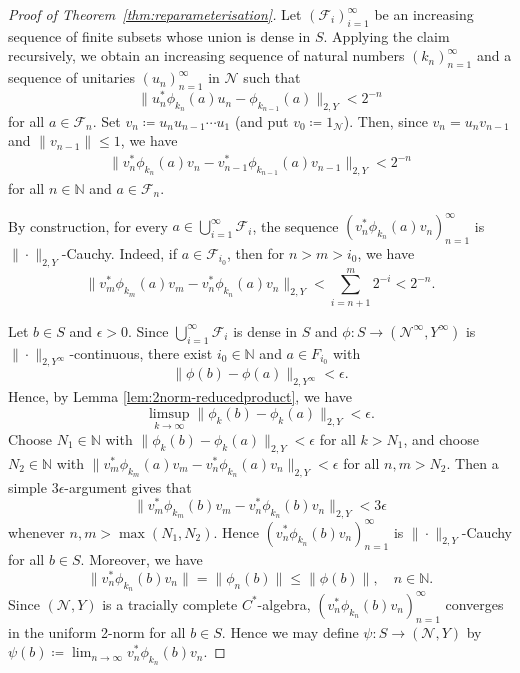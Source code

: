 \documentclass[a4paper,11pt]{amsart}
\theoremstyle{definition}
\numberwithin{equation}{section}
\numberwithin{theorem}{section}
\newcommand{\N}{\mathbb N}
\begin{document}
\begin{proof}[Proof of Theorem~\ref{thm:reparameterisation}]
Let $(\mathcal F_i)_{i=1}^\infty$ be an increasing sequence of finite subsets whose union is dense in $S$. Applying the claim recursively, we obtain an increasing sequence of natural numbers $(k_n)_{n=1}^\infty$ and a sequence of unitaries $(u_n)_{n=1}^\infty$ in $\mathcal{N}$ such that
\begin{equation}
	\|u_n^*\phi_{k_n}(a)u_n - \phi_{k_{n-1}}(a)\|_{2,Y} < 2^{-n}
\end{equation} 
for all $a \in \mathcal F_n$. Set $v_n\coloneqq u_nu_{n-1}\cdots u_1$ (and put $v_0 \coloneqq 1_{\mathcal N}$). Then, since $v_n = u_nv_{n-1}$ and $\|v_{n-1}\| \leq 1$, we have
\begin{equation}\begin{split}
	\|v_n^*\phi_{k_n}(a)v_n - v_{n-1}^*\phi_{k_{n-1}}(a)v_{n-1}\|_{2,Y} < 2^{-n}
\end{split}\end{equation}
for all $n \in \N$ and $a \in \mathcal F_n$. 

By construction, for every $a \in \bigcup_{i=1}^\infty \mathcal F_i$, the sequence $(v_n^*\phi_{k_n}(a)v_n)_{n=1}^\infty$ is $\|\cdot\|_{2,Y}$-Cauchy. Indeed, if $a \in \mathcal F_{i_0}$, then for $n > m > i_0$, we  have
\begin{equation}
	\|v_m^*\phi_{k_m}(a)v_m - v_n^*\phi_{k_n}(a)v_n\|_{2,Y} < \sum_{i=n+1}^m 2^{-i} < 2^{-n}.
\end{equation}

Let $b \in S$ and $\epsilon > 0$. Since $\bigcup_{i=1}^\infty \mathcal F_i$ is dense in $S$ and $\phi\colon S \rightarrow (\mathcal{N}^\infty, Y^\infty)$ is $\|\cdot\|_{2,Y^\infty}$-continuous, there exist $i_0 \in \N$ and $a \in F_{i_0}$ with \begin{equation}
    \|\phi(b) - \phi(a)\|_{2,Y^\infty} < \epsilon.
\end{equation}
Hence, by Lemma \ref{lem:2norm-reducedproduct}, we have
\begin{equation}
	\limsup_{k\to\infty}\|\phi_k(b) - \phi_k(a)\|_{2,Y} < \epsilon.
\end{equation}
Choose $N_1 \in \N$ with $\|\phi_k(b) - \phi_k(a)\|_{2,Y} < \epsilon$ for all $k > N_1$, and choose $N_2 \in \N$ with $\|v_m^*\phi_{k_m}(a)v_m -v_n^*\phi_{k_n}(a)v_n\|_{2,Y} < \epsilon$ for all $n,m > N_2$. Then a simple $3\epsilon$-argument gives that
\begin{equation}
	\|v_m^*\phi_{k_m}(b)v_m - v_n^*\phi_{k_n}(b)v_n\|_{2,Y} < 3\epsilon
\end{equation}
whenever $n,m > \max(N_1,N_2)$. Hence $(v_n^*\phi_{k_n}(b)v_n)_{n=1}^\infty$ is $\|\cdot\|_{2,Y}$-Cauchy for all $b \in S$. Moreover, we have 
\begin{equation}
    \|v_n^*\phi_{k_n}(b)v_n\| = \|\phi_n(b)\| \leq  \|\phi(b)\|, \quad n \in \mathbb N.
\end{equation}
Since $(\mathcal{N},Y)$ is a tracially complete $C^*$-algebra,  $(v_n^*\phi_{k_n}(b)v_n)_{n=1}^\infty$ converges in the uniform 2-norm for all $b \in S$.
Hence we may define $\psi\colon S \rightarrow (\mathcal{N},Y)$ by $\psi(b) \coloneqq \lim_{n\to\infty} v_n^*\phi_{k_n}(b)v_n$. 
  

\end{proof}
\end{document}
